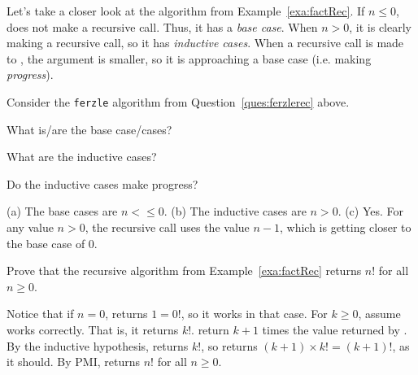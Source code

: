 \vspace*{-.1in}

\begin{exa}
Let's take a closer look at the  algorithm from Example~\ref{exa:factRec}.
If $n\leq 0$,  does not make a recursive call.  Thus,
it has a {\em base case}.
When $n>0$, it is clearly making a recursive call, so it has {\em inductive cases}.
When a recursive call is made to , the
argument is smaller, so it is approaching a base case (i.e. making {\em progress}).
\end{exa}

\vspace*{-.1in}

\begin{ques}
Consider the \verb+ferzle+ algorithm from Question~\ref{ques:ferzlerec} above.
\begin{lenum}
\item What is/are the base case/cases?

\noindent
\answerline
\item What are the inductive cases?

\noindent
\answerline
\item Do the inductive cases make progress?

\noindent
\answerline
\end{lenum}
\begin{answer}
(a) The base cases are $n<\leq 0$.
(b) The inductive cases are $n>0$.
(c) Yes.  For any value $n>0$, the recursive call uses the value $n-1$, which is getting
closer to the base case of $0$.
\end{answer}
\end{ques}

\vspace*{-.1in}

\begin{exa}
Prove that the recursive  algorithm from Example~\ref{exa:factRec} 
returns $n!$ for all $n\geq 0$.
\begin{pf}
Notice that if $n=0$,  returns $1=0!$, so it works in that case.
For $k\geq 0$, assume  works correctly.
That is, it returns $k!$.
 return $k+1$ times the value returned by .  
By the inductive hypothesis,  returns $k!$, so
 returns $(k+1)\times k!=(k+1)!$, as it should.
By PMI,   returns $n!$ for all $n\geq 0$.
\end{pf}
\end{exa}

